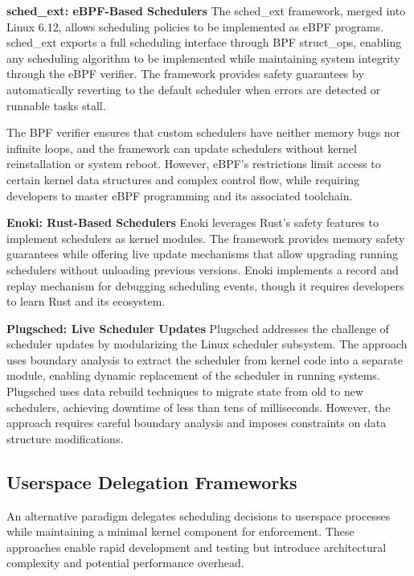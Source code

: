 \textbf{sched\_ext: eBPF-Based Schedulers} The sched\_ext framework, merged into Linux 6.12, allows scheduling policies to be implemented as eBPF programs. sched\_ext exports a full scheduling interface through BPF struct\_ops, enabling any scheduling algorithm to be implemented while maintaining system integrity through the eBPF verifier. The framework provides safety guarantees by automatically reverting to the default scheduler when errors are detected or runnable tasks stall.

\parspace
The BPF verifier ensures that custom schedulers have neither memory bugs nor infinite loops, and the framework can update schedulers without kernel reinstallation or system reboot. However, eBPF's restrictions limit access to certain kernel data structures and complex control flow, while requiring developers to master eBPF programming and its associated toolchain.

\parspace
\textbf{Enoki: Rust-Based Schedulers} Enoki\cite{enoki} leverages Rust's safety features to implement schedulers as kernel modules. The framework provides memory safety guarantees while offering live update mechanisms that allow upgrading running schedulers without unloading previous versions. Enoki implements a record and replay mechanism for debugging scheduling events, though it requires developers to learn Rust and its ecosystem.

\parspace
\textbf{Plugsched: Live Scheduler Updates} Plugsched addresses the challenge of scheduler updates by modularizing the Linux scheduler subsystem. The approach uses boundary analysis to extract the scheduler from kernel code into a separate module, enabling dynamic replacement of the scheduler in running systems. Plugsched uses data rebuild techniques to migrate state from old to new schedulers, achieving downtime of less than tens of milliseconds. However, the approach requires careful boundary analysis and imposes constraints on data structure modifications.

\subsection{Userspace Delegation Frameworks}

An alternative paradigm delegates scheduling decisions to userspace processes while maintaining a minimal kernel component for enforcement. These approaches enable rapid development and testing but introduce architectural complexity and potential performance overhead.

